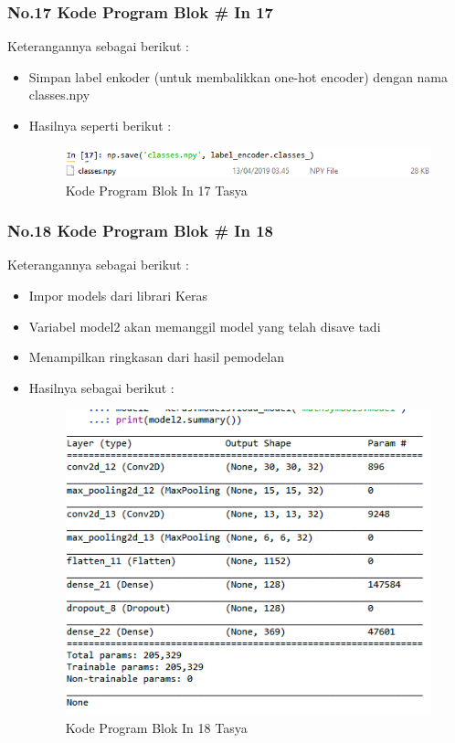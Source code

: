 \subsubsection{No.17 Kode Program Blok \# In 17}

Keterangannya sebagai berikut :\\
\begin{itemize}
\item Simpan label enkoder (untuk membalikkan one-hot encoder) dengan nama classes.npy
\item Hasilnya seperti berikut :\\
\begin{figure}[ht]
\centering
\includegraphics[scale=0.5]{figures/Chapter 7/1164086/Praktek/chapter7tasya31.png}
\caption{Kode Program Blok In 17 Tasya}
\label{Praktek}
\end{figure}
\end{itemize}

\subsubsection{No.18 Kode Program Blok \# In 18}

Keterangannya sebagai berikut :\\
\begin{itemize}
\item Impor models dari librari Keras
\item Variabel model2 akan memanggil model yang telah disave tadi 
\item Menampilkan ringkasan dari hasil pemodelan
\item Hasilnya sebagai berikut :\\
\begin{figure}[ht]
\centering
\includegraphics[scale=0.5]{figures/Chapter 7/1164086/Praktek/chapter7tasya32.png}
\caption{Kode Program Blok In 18 Tasya}
\label{Praktek}
\end{figure}
\end{itemize}

